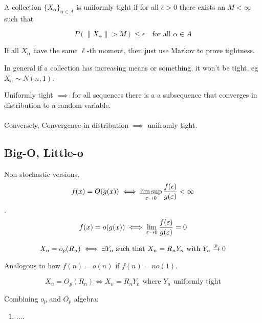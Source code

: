 \documentclass{article}
\begin{document}
\begin{definition}
A collection $\{X_\alpha\}_{\alpha \in A}$ is uniformly tight if for all $\epsilon>0$ there exists an $M<\infty$ such that 

$$P(\|X_\alpha\|>M) \leq \epsilon \quad \text{for all } \alpha \in A$$
\end{definition}
\begin{example}
If all $X_\alpha$ have the same $\ell$-th moment, then just use Markov to prove tightness. 
\end{example}
In general if a collection has increasing means or something, it won't be tight, eg $X_n \sim N(n,1)$. 

\begin{theorem}[Prohorov]
Uniformly tight $\implies$ for all sequences there is a a subsequence that converges in distribution to a random variable.\\\\
Conversely, 
Convergence in distribution $\implies$ unifromly tight. 
\end{theorem}


\subsection{Big-O, Little-o}
Non-stochastic versions, 
$$f(x) = O(g(x)) \iff \limsup_{\varepsilon\to 0} \frac{f(\epsilon)}{g(\varepsilon)} < \infty$$.
$$f(x) = o(g(x)) \iff \lim_{\varepsilon \to 0} \frac{f(\varepsilon)}{g(\varepsilon)} = 0 $$

\begin{definition}[Little-${o_p}$]
$$X_n = o_p(R_n) \iff \exists Y_n \text{ such that } X_n = R_n Y_n \text{ with } Y_n \xrightarrow{p} 0$$
\end{definition}
Analogous to how $f(n) = o(n)$ if $f(n) = n o(1)$.
\begin{definition}[Big $O_p$]
$$X_n = O_p(R_n) \iff X_n = R_n Y_n \text{ where } Y_n \text{ uniformly tight}$$
\end{definition}

Combining $o_p$ and $O_p$ algebra:
\begin{enumerate}
	\item ....
\end{enumerate}
\end{document}
